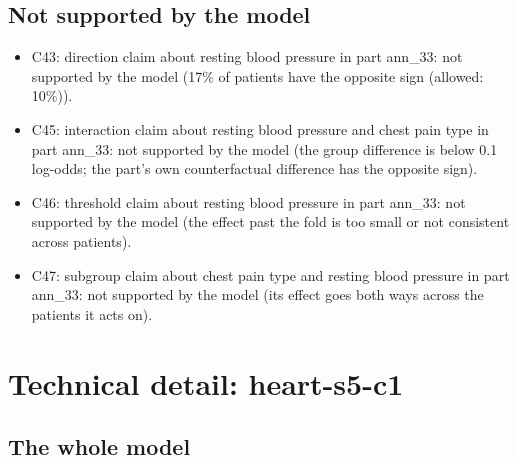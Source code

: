 \documentclass[a4paper,10pt]{article}
\newif\ifreviewmarks
\newcommand{\reviewrule}{\noindent{\color{BrickRed}\rule{\linewidth}{0.8pt}}}
\newenvironment{drafted}[1][]{%
  \ifreviewmarks\par\addvspace{\medskipamount}\reviewrule\par\nopagebreak
  \noindent{\color{BrickRed}\sffamily\footnotesize\textbf{Thesis Draft}\quad #1\hfill review}\par\nopagebreak\smallskip\fi}{%
  \ifreviewmarks\par\smallskip\noindent{\color{BrickRed}\sffamily\footnotesize end of thesis draft}\par\nopagebreak\reviewrule\par\medskip\fi}
\begin{document}
\begin{drafted}[plain-language layer: heart-s5-c1]
\subsection{Not supported by the model}
\begin{itemize}\setlength\itemsep{0pt}\small
\item C43: direction claim about resting blood pressure in part ann\_\allowbreak{}33: not supported by the model (17\% of patients have the opposite sign (allowed: 10\%)).
\item C45: interaction claim about resting blood pressure and chest pain type in part ann\_\allowbreak{}33: not supported by the model (the group difference is below 0.1 log-odds; the part's own counterfactual difference has the opposite sign).
\item C46: threshold claim about resting blood pressure in part ann\_\allowbreak{}33: not supported by the model (the effect past the fold is too small or not consistent across patients).
\item C47: subgroup claim about chest pain type and resting blood pressure in part ann\_\allowbreak{}33: not supported by the model (its effect goes both ways across the patients it acts on).
\end{itemize}
\clearpage\section*{Technical detail: heart-s5-c1}
\renewcommand{\thesubsection}{T.\arabic{subsection}}\setcounter{subsection}{0}
\subsection{The whole model}\label{tech:ann35}

\end{drafted}
\end{document}
